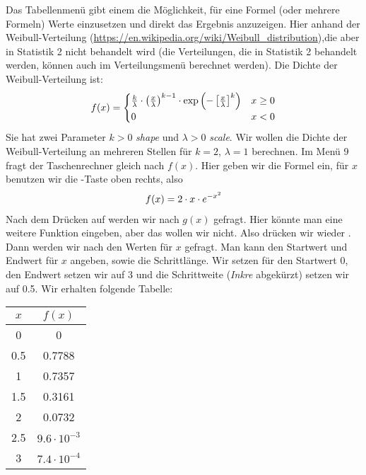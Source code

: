 \documentclass{article}
\newcommand{\taste}[1]{\fbox{\begin{varwidth}{\dimexpr\textwidth-2\fboxsep-2\fboxrule\relax}#1\end{varwidth}}}
\begin{document}
	Das Tabellenmenü gibt einem die Möglichkeit, für eine Formel (oder mehrere Formeln) Werte einzusetzen und direkt das Ergebnis anzuzeigen. Hier anhand der Weibull-Verteilung (\url{https://en.wikipedia.org/wiki/Weibull_distribution}),die aber in Statistik 2 nicht behandelt wird (die Verteilungen, die in Statistik 2 behandelt werden, können auch im Verteilungsmenü berechnet werden). Die Dichte der Weibull-Verteilung ist:
	\begin{align}
		f(x) = \begin{cases}
			\frac{k}{\lambda} \cdot\left(\frac{x}{\lambda}\right)^{k-1} \cdot \exp\left(-\left[\frac{x}{\lambda}\right]^k\right) & x\ge 0 \\
			0 & x < 0
		\end{cases} \notag
	\end{align}
	Sie hat zwei Parameter $k>0$ \textit{shape} und $\lambda > 0$ \textit{scale}. Wir wollen die Dichte der Weibull-Verteilung an mehreren Stellen für $k = 2$, $\lambda = 1$ berechnen. Im Menü 9 fragt der Taschenrechner gleich nach $f(x)$. Hier geben wir die Formel ein, für $x$ benutzen wir die \taste{$x$}-Taste oben rechts, also
	\begin{align}
		f(x) = 2\cdot x\cdot e^{-x^2} \notag
	\end{align}
	Nach dem Drücken auf \taste{=} werden wir nach $g(x)$ gefragt. Hier könnte man eine weitere Funktion eingeben, aber das wollen wir nicht. Also drücken wir wieder \taste{=}. Dann werden wir nach den Werten für $x$ gefragt. Man kann den Startwert und Endwert für $x$ angeben, sowie die Schrittlänge. Wir setzen für den Startwert 0, den Endwert setzen wir auf 3 und die Schrittweite (\textit{Inkre} abgekürzt) setzen wir auf 0.5. Wir erhalten folgende Tabelle:
	\begin{center}
		\begin{tabular}{c|c}
			$x$ & $f(x)$ \\
			\hline
			0 & 0 \\
			0.5 & 0.7788 \\
			1 & 0.7357 \\
			1.5 & 0.3161 \\
			2 & 0.0732 \\
			2.5 & $9.6 \cdot 10^{-3}$ \\
			3 & $7.4 \cdot 10^{-4}$
		\end{tabular}
	\end{center}
	
\end{document}
